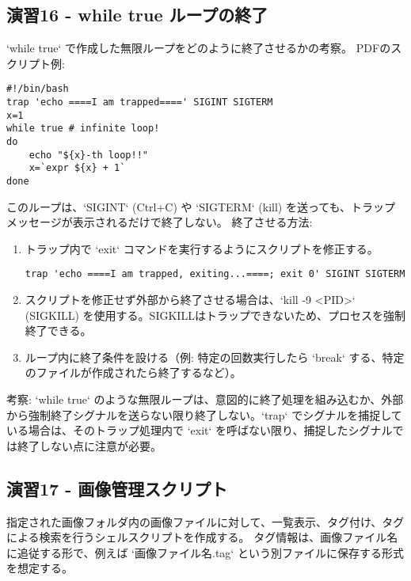 \documentclass[a4paper,11pt]{jsarticle}
\begin{document}
\subsection*{演習16 - while true ループの終了}
`while true` で作成した無限ループをどのように終了させるかの考察。
PDFのスクリプト例:
\begin{lstlisting}[caption=演習16 while true スクリプト例]
#!/bin/bash
trap 'echo ====I am trapped====' SIGINT SIGTERM
x=1
while true # infinite loop!
do
    echo "${x}-th loop!!"
    x=`expr ${x} + 1`
done
\end{lstlisting}
このループは、`SIGINT` (Ctrl+C) や `SIGTERM` (kill) を送っても、トラップメッセージが表示されるだけで終了しない。
終了させる方法:
\begin{enumerate}
    \item トラップ内で `exit` コマンドを実行するようにスクリプトを修正する。
    \begin{lstlisting}
trap 'echo ====I am trapped, exiting...====; exit 0' SIGINT SIGTERM
    \end{lstlisting}
    \item スクリプトを修正せず外部から終了させる場合は、`kill -9 <PID>` (SIGKILL) を使用する。SIGKILLはトラップできないため、プロセスを強制終了できる。
    \item ループ内に終了条件を設ける（例: 特定の回数実行したら `break` する、特定のファイルが作成されたら終了するなど）。
\end{enumerate}
考察: `while true` のような無限ループは、意図的に終了処理を組み込むか、外部から強制終了シグナルを送らない限り終了しない。`trap` でシグナルを捕捉している場合は、そのトラップ処理内で `exit` を呼ばない限り、捕捉したシグナルでは終了しない点に注意が必要。

\subsection*{演習17 - 画像管理スクリプト}
指定された画像フォルダ内の画像ファイルに対して、一覧表示、タグ付け、タグによる検索を行うシェルスクリプトを作成する。
タグ情報は、画像ファイル名に追従する形で、例えば `画像ファイル名.tag` という別ファイルに保存する形式を想定する。
\end{document}
